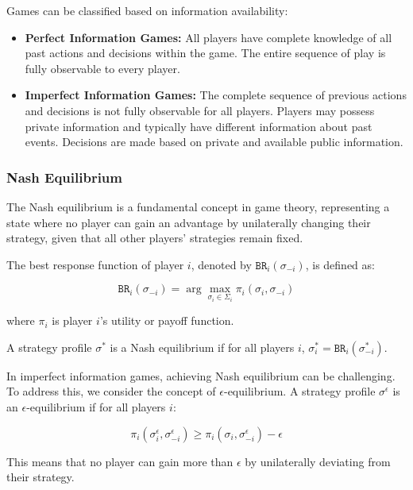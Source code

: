 \documentclass[11pt]{article}
\begin{document}
Games can be classified based on information availability:

\begin{itemize}
  \item \textbf{Perfect Information Games:} All players have complete knowledge of all past actions and decisions within the game. The entire sequence of play is fully observable to every player.
  
  \item \textbf{Imperfect Information Games:} The complete sequence of previous actions and decisions is not fully observable for all players. Players may possess private information and typically have different information about past events. Decisions are made based on private and available public information.
\end{itemize}

\subsubsection{Nash Equilibrium}

The Nash equilibrium is a fundamental concept in game theory, representing a state where no player can gain an advantage by unilaterally changing their strategy, given that all other players' strategies remain fixed.\cite{daskalakis2009complexity}

The best response function of player $i$, denoted by $\texttt{BR}_i(\sigma_{-i})$, is defined as:

\begin{equation}
\texttt{BR}_i(\sigma_{-i}) = \arg\max_{\sigma_i \in \Sigma_i} \pi_i(\sigma_i,\sigma_{-i})
\end{equation}

where $\pi_i$ is player $i$'s utility or payoff function.

A strategy profile $\sigma^*$ is a Nash equilibrium if for all players $i$, $\sigma_i^* = \texttt{BR}_i(\sigma_{-i}^*)$.

In imperfect information games, achieving Nash equilibrium can be challenging. To address this, we consider the concept of $\epsilon$-equilibrium. A strategy profile $\sigma^\epsilon$ is an $\epsilon$-equilibrium if for all players $i$:

\begin{equation}
\pi_i(\sigma^\epsilon_i,\sigma^\epsilon_{-i}) \geq \pi_i(\sigma_i, \sigma^\epsilon_{-i}) - \epsilon
\end{equation}

This means that no player can gain more than $\epsilon$ by unilaterally deviating from their strategy.
\end{document}
